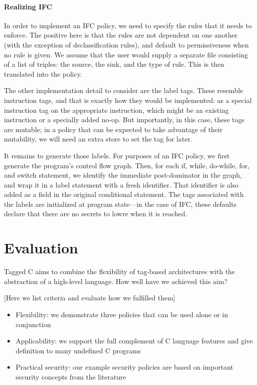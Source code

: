 \documentclass[acmsmall,review,anonymous]{acmart}\settopmatter{printfolios=true,printccs=false,printacmref=false}
\begin{document}
\paragraph*{Realizing IFC}

In order to implement an IFC policy, we need to specify the rules that it needs to enforce.
The positive here is that the rules are not dependent on one another (with the exception of
declassification rules), and default to permissiveness when no rule is given. We assume that
the user would supply a separate file consisting of a list of triples: the source, the sink,
and the type of rule. This is then translated into the policy.

The other implementation detail to consider are the label tags. These resemble
instruction tags, and that is exactly how they would be implemented: as a special instruction
tag on the appropriate instruction, which might be an existing instruction or a specially
added no-op. But importantly, in this case, these tags are mutable; in a policy that can be
expected to take advantage of their mutability, we will need an extra store to set the tag
for later.

It remains to generate those labels. For purposes of an IFC policy, we first generate the program's
control flow graph. Then, for each if, while, do-while, for, and switch statement, we identify the
immediate post-dominator in the graph, and wrap it in a label statement with a fresh identifier.
That identifier is also added as a field in the original conditional statement. The tags
associated with the labels are initialized at program state---in the case of IFC, these defaults
declare that there are no secrets to lowre when it is reached.

\section{Evaluation}
\label{sec:evaluation}

Tagged C aims to combine the flexibility of tag-based architectures with the abstraction
of a high-level language. How well have we achieved this aim?

[Here we list criteria and evaluate how we fulfilled them]

\begin{itemize}
\item Flexibility: we demonstrate three policies that can be used alone or in conjunction
\item Applicability: we support the full complement of C language features and give definition
  to many undefined C programs
\item Practical security: our example security policies are based on important security concepts
  from the literature
\end{itemize}
\end{document}
